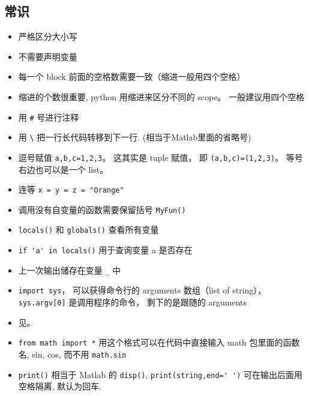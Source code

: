 
\begin{issues}
\issueDraft
\end{issues}


\subsection{常识}
\begin{itemize}
\item 严格区分大小写
\item 不需要声明变量
\item 每一个 block 前面的空格数需要一致（缩进一般用四个空格）
\item 缩进的个数很重要, python 用缩进来区分不同的 scope。 一般建议用四个空格
\item 用 \verb`#` 号进行注释
\item 用 \verb`\` 把一行长代码转移到下一行. (相当于Matlab里面的省略号)
\item 逗号赋值 \verb`a,b,c=1,2,3`。 这其实是 tuple 赋值， 即 \verb`(a,b,c)=(1,2,3)`。 等号右边也可以是一个 list。
\item 连等 \verb`x = y = z = "Orange"`
\item 调用没有自变量的函数需要保留括号  \verb`MyFun()`
\item \verb`locals()` 和 \verb`globals()` 查看所有变量
\item \verb`if 'a' in locals()` 用于查询变量 a 是否存在
\item 上一次输出储存在变量 \verb`_` 中
\item \verb`import sys`， 可以获得命令行的 arguments 数组（list of string）， \verb`sys.argv[0]` 是调用程序的命令， 剩下的是跟随的 arguments
\item 见。
\item \verb`from math import *` 用这个格式可以在代码中直接输入 math 包里面的函数名, sin, cos, 而不用 \verb`math.sin`
\item \verb`print()` 相当于 Matlab 的 \verb`disp()`, \verb`print(string,end=' ')` 可在输出后面用空格隔离, 默认为回车. 
\end{itemize}

